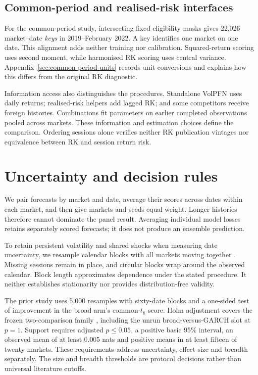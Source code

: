 \subsection{Common-period and realised-risk interfaces}

For the common-period study, intersecting fixed eligibility masks gives 22,026 market--date \emph{keys} in 2019--February 2022. A key identifies one market on one date. This alignment adds neither training nor calibration. Squared-return scoring uses second moment, while harmonised RK scoring uses central variance. Appendix~\ref{sec:common-period-units} records unit conversions and explains how this differs from the original RK diagnostic.

Information access also distinguishes the procedures. Standalone VolPFN uses daily returns; realised-risk helpers add lagged RK; and some competitors receive foreign histories. Combinations fit parameters on earlier completed observations pooled across markets. These information and estimation choices define the comparison. Ordering sessions alone verifies neither RK publication vintages nor equivalence between RK and session return risk.

\section{Uncertainty and decision rules}
\label{sec:inference}

We pair forecasts by market and date, average their scores across dates within each market, and then give markets and seeds equal weight. Longer histories therefore cannot dominate the panel result. Averaging individual model losses retains separately scored forecasts; it does not produce an ensemble prediction.

To retain persistent volatility and shared shocks when measuring date uncertainty, we resample calendar blocks with all markets moving together \citep{kunsch1989jackknife}. Missing sessions remain in place, and circular blocks wrap around the observed calendar. Block length approximates dependence under the stated procedure. It neither establishes stationarity nor provides distribution-free validity.

The prior study uses 5,000 resamples with sixty-date blocks and a one-sided test of improvement in the broad arm's common-$t_8$ score. Holm adjustment covers the frozen two-comparison family \citep{holm1979simple}, including the unrun broad-versus-GARCH slot at $p=1$. Support requires adjusted $p\leq0.05$, a positive basic 95\% interval, an observed mean of at least 0.005 nats and positive means in at least fifteen of twenty markets. These requirements address uncertainty, effect size and breadth separately. The size and breadth thresholds are protocol decisions rather than universal literature cutoffs.

